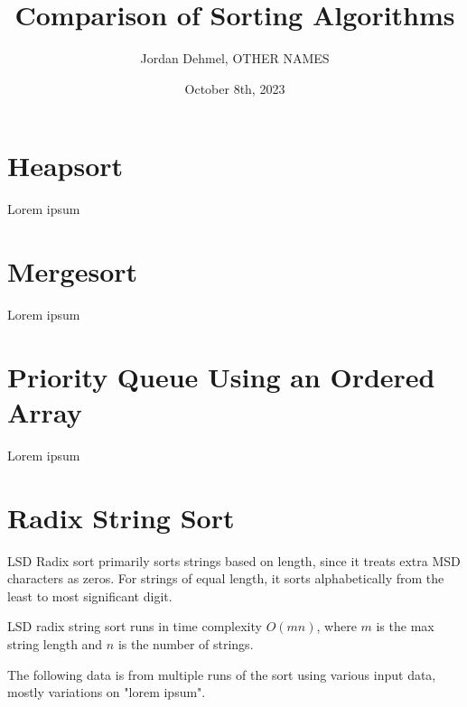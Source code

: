 \documentclass[12pt]{amsart}
\title{Comparison of Sorting Algorithms}
\author{Jordan Dehmel, OTHER NAMES}
\date{October 8th, 2023}
\begin{document}
\maketitle

\section{Heapsort}
    Lorem ipsum

\section{Mergesort}
    Lorem ipsum

\section{Priority Queue Using an Ordered Array}
    Lorem ipsum

\section{Radix String Sort}

    LSD Radix sort primarily sorts strings based on length,
    since it treats extra MSD characters as zeros. For strings
    of equal length, it sorts alphabetically from the least to
    most significant digit.

    LSD radix string sort runs in time complexity $O(mn)$, where
    $m$ is the max string length and $n$ is the number of
    strings.

    The following data is from multiple runs of the sort using
    various input data, mostly variations on "lorem ipsum".
\end{document}
